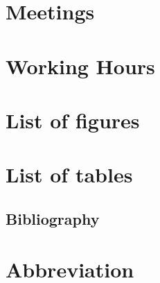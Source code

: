 \singlespacing    %

\section{Meetings}
    
\pagebreak

\section{Working Hours}
    
\pagebreak

\section{List of figures}
{\def\section*#1{}\listoffigures}
\pagebreak

\section{List of tables}
    {\def\section*#1{}\listoftables}
\pagebreak

\begin{flushleft}
        \section{Bibliography}
    \renewcommand{\headrulewidth}{0.4pt}
    {\def\section*#1{}\printbibliography}
\end{flushleft}
\newpage

\section{Abbreviation}
